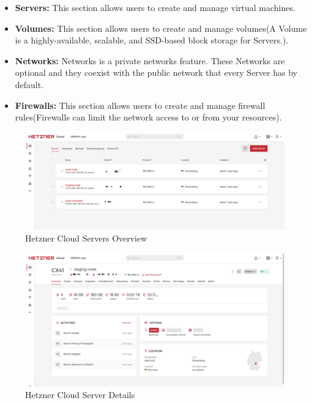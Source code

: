 \begin{itemize}
  \item \textbf{Servers:} This section allows users to create and manage virtual machines.
  \item \textbf{Volumes:} This section allows users to create and manage volumes(A Volume is a highly-available, scalable, and SSD-based block storage for Servers.).
  \item \textbf{Networks:} Networks is a private networks feature. These Networks are optional and they coexist with the public network that every Server has by default.

  \item \textbf{Firewalls:} This section allows users to create and manage firewall rules(Firewalls can limit the network access to or from your resources).
\end{itemize}




\begin{figure}[H]
  \centering
  \includegraphics[width=1\textwidth]{src/assets/chapters/servers.png}
  \caption{Hetzner Cloud Servers Overview}
  \label{fig:cloud-project-servers-overview}
\end{figure}

\begin{figure}[H]
  \centering
  \includegraphics[width=1\textwidth]{src/assets/chapters/serversoverview.png}
  \caption{Hetzner Cloud Server Details}
  \label{fig:cloud-project-server-details}
\end{figure}

